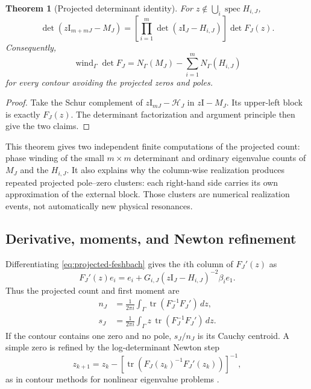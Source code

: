 \documentclass[11pt]{article}
\newtheorem{theorem}{Theorem}[section]
\theoremstyle{definition}
\theoremstyle{remark}
\newcommand{\Id}{\mathrm I}
\newcommand{\cH}{\mathcal H}
\newcommand{\spec}{\operatorname{spec}}
\newcommand{\tr}{\operatorname{tr}}
\newcommand{\wind}{\operatorname{wind}}
\begin{document}
\begin{theorem}[Projected determinant identity]
\label{thm:projected-determinant}
For $z\notin\bigcup_i\spec H_{i,J}$,
\begin{equation}
 \det(z\Id_{m+mJ}-M_J)
 =\left[\prod_{i=1}^m\det(z\Id_J-H_{i,J})\right]\det F_J(z).
 \label{eq:projected-det-identity}
\end{equation}
Consequently,
\begin{equation}
 \wind_\Gamma\det F_J
 =N_\Gamma(M_J)-\sum_{i=1}^m N_\Gamma(H_{i,J})
 \label{eq:projected-count}
\end{equation}
for every contour avoiding the projected zeros and poles.
\end{theorem}

\begin{proof}
Take the Schur complement of $z\Id_{mJ}-\cH_J$ in
$z\Id-M_J$.  Its upper-left block is exactly $F_J(z)$.  The determinant
factorization and argument principle then give the two claims.
\end{proof}

This theorem gives two independent finite computations of the projected
count: phase winding of the small $m\times m$ determinant and ordinary
eigenvalue counts of $M_J$ and the $H_{i,J}$.  It also explains why the
column-wise realization produces repeated projected pole--zero clusters:
each right-hand side carries its own approximation of the external block.
Those clusters are numerical realization events, not automatically new
physical resonances.

\subsection{Derivative, moments, and Newton refinement}

Differentiating \cref{eq:projected-feshbach} gives the $i$th column of
$F_J'(z)$ as
\begin{equation}
 F_J'(z)e_i
 =e_i+G_{i,J}(z\Id_J-H_{i,J})^{-2}\beta_i e_1.
 \label{eq:feshbach-derivative}
\end{equation}
Thus the projected count and first moment are
\begin{align}
 n_J&=\frac{1}{2\pi i}\int_\Gamma
 \tr(F_J^{-1}F_J')\,dz,
 \label{eq:cauchy-count}\\
 s_J&=\frac{1}{2\pi i}\int_\Gamma
 z\,\tr(F_J^{-1}F_J')\,dz.
 \label{eq:cauchy-moment}
\end{align}
If the contour contains one zero and no pole, $s_J/n_J$ is its Cauchy
centroid.  A simple zero is refined by the log-determinant Newton step
\begin{equation}
 z_{k+1}=z_k-
 \left[\tr\!\left(F_J(z_k)^{-1}F_J'(z_k)\right)\right]^{-1},
 \label{eq:newton}
\end{equation}
as in contour methods for nonlinear eigenvalue problems
\citep{Beyn2012}.
\end{document}
